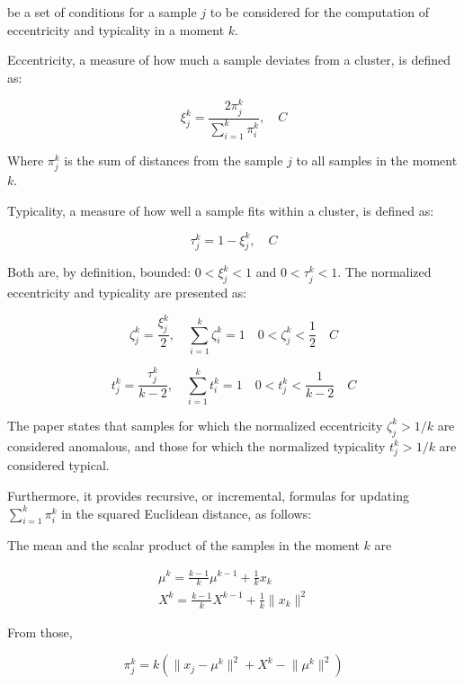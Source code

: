 \documentclass[a4paper]{article}
\begin{document}
be a set of conditions for a sample $j$ to be considered for the computation of eccentricity and typicality in a moment $k$.

Eccentricity, a measure of how much a sample deviates from a cluster, is defined as:

\begin{equation}
    \xi^k_j = \frac{2\pi^k_j}{\sum_{i=1}^{k} \pi^k_i}, \quad C
\end{equation}

Where $\pi^k_j$ is the sum of distances from the sample $j$ to all samples in the moment $k$.

Typicality, a measure of how well a sample fits within a cluster, is defined as:

\begin{equation}
    \tau^k_j = 1 - \xi^k_j, \quad C
\end{equation}

Both are, by definition, bounded: $0 < \xi^k_j < 1$ and $0 < \tau^k_j < 1$. The normalized eccentricity and typicality are presented as:

\begin{equation}
    \zeta^k_j = \frac{\xi^k_j}{2}, \quad \sum_{i=1}^{k} \zeta^k_i = 1\quad 0 < \zeta^k_j < \frac{1}{2}\quad C
\end{equation}

\begin{equation}
    t^k_j = \frac{\tau^k_j}{k - 2}, \quad \sum_{i=1}^{k} t^k_i = 1\quad 0 < t^k_j < \frac{1}{k - 2}\quad C
\end{equation}

The paper states that samples for which the normalized eccentricity $\zeta^k_j > 1/k$ are considered anomalous, and those for which the normalized typicality $t^k_j > 1/k$ are considered typical.

Furthermore, it provides recursive, or incremental, formulas for updating $\sum_{i=1}^{k} \pi^k_i$ in the squared Euclidean distance, as follows:

The mean and the scalar product of the samples in the moment $k$ are

\begin{gather}
    \mu^k = \frac{k - 1}{k} \mu^{k-1} + \frac{1}{k} x_k \\
    X^k = \frac{k - 1}{k} X^{k-1} + \frac{1}{k} \lVert x_k \rVert^2
\end{gather}

From those,

\begin{equation}
    \pi^k_j = k (\lVert x_j - \mu^k \rVert^2 + X^k - \lVert \mu^k \rVert^2)
\end{equation}
\end{document}
